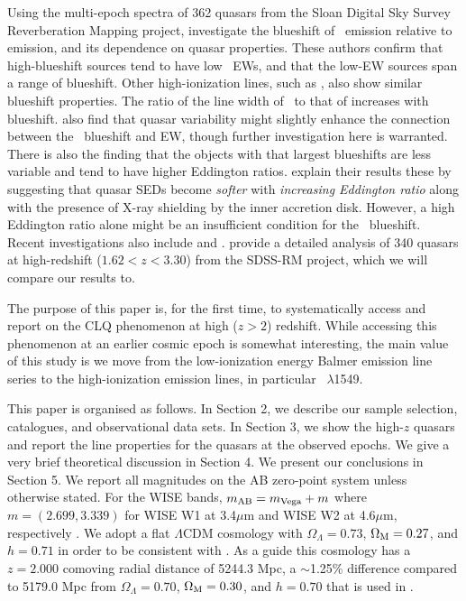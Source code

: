 \documentclass[a4paper,fleqn,usenatbib]{mnras}
\begin{document}
Using the multi-epoch spectra of 362 quasars from the Sloan Digital
Sky Survey Reverberation Mapping \citep[SDSS-RM; ][]{Shen2015,
Shen2019} project, \citet{Sun2018} investigate the blueshift of \civ\
emission relative to \mgii emission, and its dependence on quasar
properties.  These authors confirm that high-blueshift sources tend to
have low \civ\ EWs, and that the low-EW sources span a range of
blueshift. Other high-ionization lines, such as \heii, also show
similar blueshift properties. The ratio of the line width of \civ\ to
that of \mgii increases with blueshift.  \citet{Sun2018} also find
that quasar variability might slightly enhance the connection between
the \civ\ blueshift and EW, though further investigation here is
warranted.  There is also the finding that the objects with that
largest blueshifts are less variable and tend to have higher Eddington
ratios.  \citet{Sun2018} explain their results these by suggesting
that quasar SEDs become {\it softer} with {\it increasing Eddington
ratio} along with the presence of X-ray shielding by the inner
accretion disk.  However, a high Eddington ratio alone might be an
insufficient condition for the \civ\ blueshift.
Recent investigations also include \citet{Meyer2019} and \citet{Doan2019}. 
\citet{Dyer2019} provide a detailed analysis of 340 quasars at high-redshift
($1.62<z<3.30$) from the SDSS-RM project, which we will compare our
results to.


The purpose of this paper is, for the first time, to systematically
access and report on the CLQ phenomenon at high ($z>2$)
redshift. While accessing this phenomenon at an earlier cosmic epoch
is somewhat interesting, the main value of this study is we move from
the low-ionization energy Balmer emission line series to the
high-ionization emission lines, in particular \civ\ $\lambda$1549.

This paper is organised as follows. In Section 2, we describe our
sample selection, catalogues, and observational data sets.  In Section 3,
we show the high-$z$ quasars and report the line properties for the
quasars at the observed epochs.  We give a very brief theoretical
discussion in Section 4. We present our conclusions in Section 5.  We
report all magnitudes on the AB zero-point system \citep{Oke_Gunn1983,
Fukugita1996} unless otherwise stated. For the WISE bands,
$m_{\rm AB} = m_{\rm Vega} + m$ where $m = (2.699, 3.339)$ for WISE W1
at 3.4$\mu$m and WISE W2 at 4.6$\mu$m, respectively
\citep{Cutri2011}.
We adopt a flat $\Lambda$CDM cosmology with $\Omega_{\Lambda} = 0.73$,
$\Omega_{\rm M} = 0.27$, and $h = 0.71$ in order to be consistent with
\citet{Hamann2017}. As a guide this cosmology has a $z=2.000$
comoving radial distance of 5244.3 Mpc, a $\sim$1.25\% difference
compared to 5179.0 Mpc from $\Omega_{\Lambda} = 0.70$, $\Omega_{\rm M}
= 0.30$, and $h = 0.70$ that is used in \citet{Shen2011}.
\end{document}
